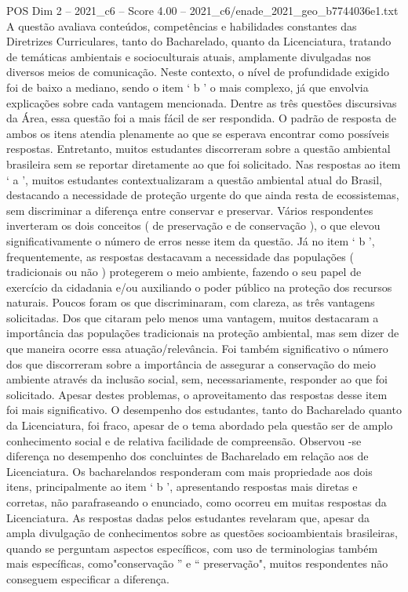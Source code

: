 \begin{textsample}{POS Dim 2 – 2021\_c6 – Score 4.00 – 2021\_c6/enade\_2021\_geo\_b7744036e1.txt}
A questão avaliava conteúdos, competências e habilidades constantes das Diretrizes Curriculares, tanto do Bacharelado, quanto da Licenciatura, tratando de temáticas ambientais e socioculturais atuais, amplamente divulgadas nos diversos meios de comunicação.
Neste contexto, o nível de profundidade exigido foi de baixo a mediano, sendo o item ‘ b ’ o mais complexo, já que envolvia explicações sobre cada vantagem mencionada.
Dentre as três questões discursivas da Área, essa questão foi a mais fácil de ser respondida.
O padrão de resposta de ambos os itens atendia plenamente ao que se esperava encontrar como possíveis respostas.
Entretanto, muitos estudantes discorreram sobre a questão ambiental brasileira sem se reportar diretamente ao que foi solicitado.
Nas respostas ao item ‘ a ’, muitos estudantes contextualizaram a questão ambiental atual do Brasil, destacando a necessidade de proteção urgente do que ainda resta de ecossistemas, sem discriminar a diferença entre conservar e preservar.
Vários respondentes inverteram os dois conceitos ( de preservação e de conservação ), o que elevou significativamente o número de erros nesse item da questão.
Já no item ‘ b ’, frequentemente, as respostas destacavam a necessidade das populações ( tradicionais ou não ) protegerem o meio ambiente, fazendo o seu papel de exercício da cidadania e/ou auxiliando o poder público na proteção dos recursos naturais.
Poucos foram os que discriminaram, com clareza, as três vantagens solicitadas.
Dos que citaram pelo menos uma vantagem, muitos destacaram a importância das populações tradicionais na proteção ambiental, mas sem dizer de que maneira ocorre essa atuação/relevância.
Foi também significativo o número dos que discorreram sobre a importância de assegurar a conservação do meio ambiente através da inclusão social, sem, necessariamente, responder ao que foi solicitado.
Apesar destes problemas, o aproveitamento das respostas desse item foi mais significativo.
O desempenho dos estudantes, tanto do Bacharelado quanto da Licenciatura, foi fraco, apesar de o tema abordado pela questão ser de amplo conhecimento social e de relativa facilidade de compreensão.
Observou -se diferença no desempenho dos concluintes de Bacharelado em relação aos de Licenciatura.
Os bacharelandos responderam com mais propriedade aos dois itens, principalmente ao item ‘ b ’, apresentando respostas mais diretas e corretas, não parafraseando o enunciado, como ocorreu em muitas respostas da Licenciatura.
As respostas dadas pelos estudantes revelaram que, apesar da ampla divulgação de conhecimentos sobre as questões socioambientais brasileiras, quando se perguntam aspectos específicos, com uso de terminologias também mais específicas, como"conservação ” e “ preservação", muitos respondentes não conseguem especificar a diferença.

\end{textsample}
